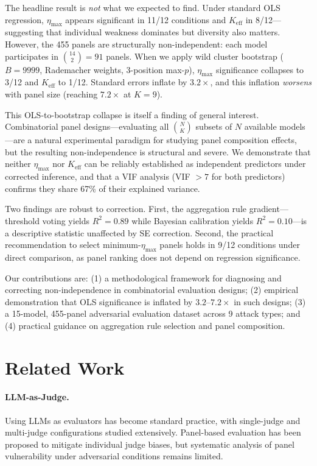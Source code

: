 \documentclass[11pt]{article}
\begin{document}
The headline result is \emph{not} what we expected to find. Under standard OLS regression, $\eta_{\max}$ appears significant in 11/12 conditions and $K_{\text{eff}}$ in 8/12---suggesting that individual weakness dominates but diversity also matters. However, the 455 panels are structurally non-independent: each model participates in $\binom{14}{2} = 91$ panels. When we apply wild cluster bootstrap ($B{=}9999$, Rademacher weights, 3-position max-$p$), $\eta_{\max}$ significance collapses to 3/12 and $K_{\text{eff}}$ to 1/12. Standard errors inflate by $3.2\times$, and this inflation \emph{worsens} with panel size (reaching $7.2\times$ at $K{=}9$).

This OLS-to-bootstrap collapse is itself a finding of general interest. Combinatorial panel designs---evaluating all $\binom{N}{K}$ subsets of $N$ available models---are a natural experimental paradigm for studying panel composition effects, but the resulting non-independence is structural and severe. We demonstrate that neither $\eta_{\max}$ nor $K_{\text{eff}}$ can be reliably established as independent predictors under corrected inference, and that a VIF analysis (VIF $> 7$ for both predictors) confirms they share 67\% of their explained variance.

Two findings are robust to correction. First, the aggregation rule gradient---threshold voting yields $R^2{=}0.89$ while Bayesian calibration yields $R^2{=}0.10$---is a descriptive statistic unaffected by SE correction. Second, the practical recommendation to select minimum-$\eta_{\max}$ panels holds in 9/12 conditions under direct comparison, as panel ranking does not depend on regression significance.

Our contributions are: (1) a methodological framework for diagnosing and correcting non-independence in combinatorial evaluation designs; (2) empirical demonstration that OLS significance is inflated by $3.2$--$7.2\times$ in such designs; (3) a 15-model, 455-panel adversarial evaluation dataset across 9 attack types; and (4) practical guidance on aggregation rule selection and panel composition.


\section{Related Work}

\paragraph{LLM-as-Judge.} Using LLMs as evaluators has become standard practice, with single-judge and multi-judge configurations studied extensively. Panel-based evaluation has been proposed to mitigate individual judge biases, but systematic analysis of panel vulnerability under adversarial conditions remains limited.
\end{document}
